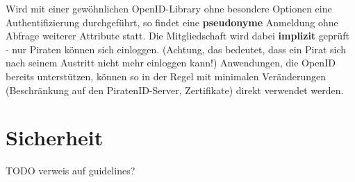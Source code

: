 \documentclass[parskip=half]{scrartcl}
\begin{document}
Wird mit einer gewöhnlichen OpenID-Library ohne besondere Optionen eine Authentifizierung durchgeführt,
so findet eine \textbf{pseudonyme} Anmeldung ohne Abfrage weiterer Attribute statt.
Die Mitgliedschaft wird dabei \textbf{implizit} geprüft - nur Piraten können sich einloggen.
(Achtung, das bedeutet, dass ein Pirat sich nach seinem Austritt nicht mehr einloggen kann!)
Anwendungen, die OpenID bereits unterstützen, können so in der Regel mit minimalen Veränderungen (Beschränkung auf den PiratenID-Server, Zertifikate) direkt verwendet werden.


\newpage
\section{Sicherheit}

TODO verweis auf guidelines?
\end{document}
